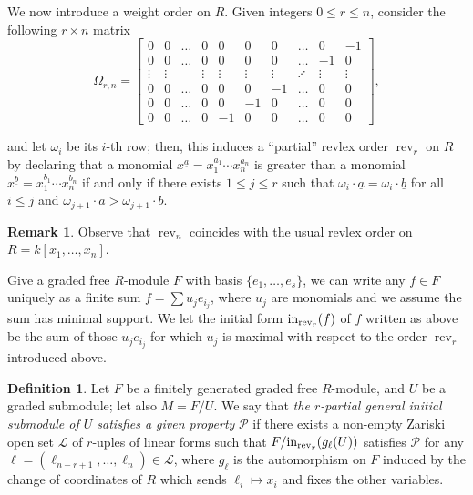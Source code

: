 \documentclass[12pt]{amsart}
\newcommand{\ooo}[1]{{\color{red} \sf $\clubsuit\clubsuit\clubsuit$ [#1]}}
\theoremstyle{definition}
\theoremstyle{definition}
\newtheorem{remark}[theorem]{Remark}
\newtheorem{definition}[theorem]{Definition}
\newcommand{\ul}[1]{
\underline{#1}}
\renewcommand{\leq}{\leqslant}
\DeclareMathOperator{\rev}{rev}
\begin{document}
We now introduce a weight order on $R$. Given integers $0 \leq r \leq n$, consider the following $r \times n$ matrix 
\[
\Omega_{r,n} = \begin{bmatrix} 0 & 0 & \ldots & 0 & 0 & 0 & 0 & \ldots & 0 & -1 \\
0 & 0 & \ldots & 0 & 0 & 0 & 0 & \ldots & -1 & 0 \\
\vdots & \vdots &  & \vdots & \vdots & \vdots &  \vdots & \iddots & \vdots &\vdots\\
0 & 0 & \ldots & 0 & 0 & 0 & -1 & \ldots & 0 & 0 \\
0 & 0 & \ldots & 0 & 0 & -1 & 0 & \ldots & 0 & 0 \\
0 & 0 & \ldots & 0 &-1 & 0 & 0 & \ldots & 0 & 0
\end{bmatrix},
\]

    
\smallskip    
\noindent
and let $\omega_i$ be its $i$-th row; then,  this induces a ``partial'' revlex order $\rev_r$ on $R$ by declaring that a monomial $x^{\ul{a}} = x_1^{a_1} \cdots x_n^{a_n}$ is greater than a monomial $x^{\ul b} = x_1^{b_1} \cdots x_n^{b_n}$ if and only if there exists $1 \leq j \leq r$ such that $\omega_i \cdot \ul{a} = \omega_i \cdot \ul{b}$ for all $i \leq j$ and $\omega_{j+1} \cdot \ul{a} > \omega_{j+1} \cdot \ul{b}$. 


\begin{remark} \label{remark revlex} Observe that $\rev_n$ coincides with the usual revlex order on $R=k[x_1,\ldots,x_n]$. %
\end{remark}

Give  a graded free $R$-module $F$ with basis $\{e_1,\ldots,e_s\}$,  we can write any $f \in F$ uniquely as a finite sum $f =\sum u_j e_{i_j}$, where $u_j$ are monomials and we assume the sum has minimal support. We let the initial form ${\rm in}_{\rev_r}(f)$ of $f$ written as above  be the sum of those $u_j e_{i_j}$ for which $u_j$ is maximal with respect to the order $\rev_r$ introduced above.

\begin{definition} \label{def partial gin}
Let $F$ be a finitely generated graded free $R$-module, and $U$ be a graded submodule; let also $M=F/U$. We say that {\em the $r$-partial general initial submodule of $U$ satisfies a given property} {\bf {$\mathcal P$}} if there exists a non-empty Zariski open set $\mathcal L$ of $r$-uples of linear forms such that $F/{\rm in}_{\rev_r}(g_\ell(U))$ satisfies  {\bf {$\mathcal P$}} for any $\ell=(\ell_{n-r+1},\ldots,\ell_n) \in \mathcal{L}$, where $g_{\ell}$ is the automorphism on $F$ induced by the change of coordinates of $R$ which sends $\ell_i  \mapsto x_i$ and fixes the other variables.
\end{definition} 
\end{document}
